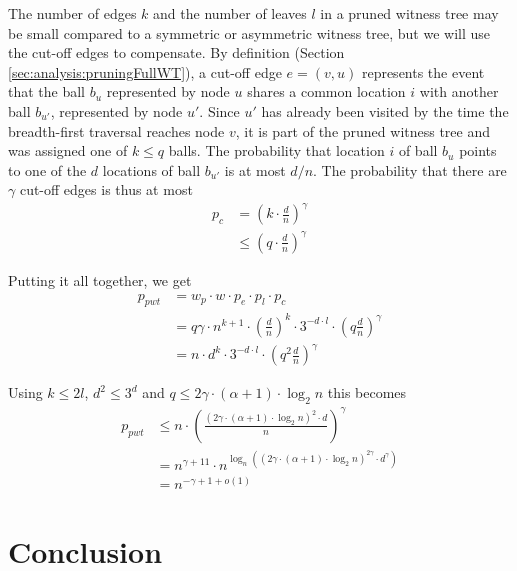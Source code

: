 \documentclass[a4paper,12pt]{article}
\begin{document}
The number of edges $k$ and the number of leaves $l$ in a pruned witness tree may be small compared to a symmetric or asymmetric witness tree, but we will use the cut-off edges to compensate. By definition (Section \ref{sec:analysis:pruningFullWT}), a cut-off edge $e=(v, u)$ represents the event that the ball $b_u$ represented by node $u$ shares a common location $i$ with another ball $b_{u'}$, represented by node $u'$. Since $u'$ has already been visited by the time the breadth-first traversal reaches node $v$, it is part of the pruned witness tree and was assigned one of $k\leq q$ balls. The probability that location $i$ of ball $b_u$ points to one of the $d$ locations of ball $b_{u'}$ is at most $d/n$. The probability that there are $\gamma$ cut-off edges is thus at most 
\begin{align}
p_c &= \left(k\cdot \frac{d}{n}\right)^\gamma \\
    & \leq \left(q\cdot \frac{d}{n}\right)^\gamma
\end{align}

Putting it all together, we get 
\begin{align}
p_{pwt} &= w_p\cdot w \cdot p_e \cdot p_l \cdot p_c \\
		&= q\gamma\cdot n^{k+1}\cdot \left(\frac{d}{n}\right)^k\cdot3^{-d\cdot l} \cdot \left(q \frac{d}{n}\right)^\gamma\\
		&= n \cdot d^k\cdot 3^{-d\cdot l} \cdot \left(q^2 \frac{d}{n} \right)^\gamma 
\end{align}

Using $k \leq 2l$, $d^2 \leq 3^d$ and $q \leq 2\gamma \cdot \left( \alpha +1 \right) \cdot \log_2 n$ this becomes
\begin{align}
p_{pwt} &\leq n\cdot \left(\frac{\left(2\gamma \cdot \left(\alpha +1 \right) \cdot \log_2 n\right)^2\cdot d}{n}\right)^\gamma \\
        &= n^{\gamma +1 1} \cdot n ^{\log_n\left( \left(2\gamma\cdot \left(\alpha+1\right)\cdot \log_2n \right)^{2\gamma} \cdot d^\gamma \right)}\\
        &= n^{-\gamma+1+o\left(1\right)}
\end{align}

 
\section{Conclusion}
\label{sec:conclusion}
\end{document}
